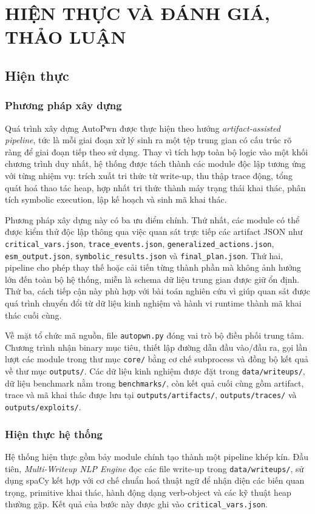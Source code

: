 \documentclass[final]{hcmuitthesis}
\begin{document}
\chapter{HIỆN THỰC VÀ ĐÁNH GIÁ, THẢO LUẬN}

\section{Hiện thực}

\subsection{Phương pháp xây dựng}
Quá trình xây dựng AutoPwn được thực hiện theo hướng \textit{artifact-assisted pipeline}, tức là mỗi giai đoạn xử lý sinh ra một tệp trung gian có cấu trúc rõ ràng để giai đoạn tiếp theo sử dụng. Thay vì tích hợp toàn bộ logic vào một khối chương trình duy nhất, hệ thống được tách thành các module độc lập tương ứng với từng nhiệm vụ: trích xuất tri thức từ write-up, thu thập trace động, tổng quát hoá thao tác heap, hợp nhất tri thức thành máy trạng thái khai thác, phân tích symbolic execution, lập kế hoạch và sinh mã khai thác.

Phương pháp xây dựng này có ba ưu điểm chính. Thứ nhất, các module có thể được kiểm thử độc lập thông qua việc quan sát trực tiếp các artifact JSON như \texttt{critical\_vars.json}, \texttt{trace\_events.json}, \texttt{generalized\_actions.json}, \texttt{esm\_output.json}, \texttt{symbolic\_results.json} và \texttt{final\_plan.json}. Thứ hai, pipeline cho phép thay thế hoặc cải tiến từng thành phần mà không ảnh hưởng lớn đến toàn bộ hệ thống, miễn là schema dữ liệu trung gian được giữ ổn định. Thứ ba, cách tiếp cận này phù hợp với bài toán nghiên cứu vì giúp quan sát được quá trình chuyển đổi từ dữ liệu kinh nghiệm và hành vi runtime thành mã khai thác cuối cùng.

Về mặt tổ chức mã nguồn, file \texttt{autopwn.py} đóng vai trò bộ điều phối trung tâm. Chương trình nhận binary mục tiêu, thiết lập đường dẫn đầu vào/đầu ra, gọi lần lượt các module trong thư mục \texttt{core/} bằng cơ chế subprocess và đồng bộ kết quả về thư mục \texttt{outputs/}. Các dữ liệu kinh nghiệm được đặt trong \texttt{data/writeups/}, dữ liệu benchmark nằm trong \texttt{benchmarks/}, còn kết quả cuối cùng gồm artifact, trace và mã khai thác được lưu tại \texttt{outputs/artifacts/}, \texttt{outputs/traces/} và \texttt{outputs/exploits/}.

\subsection{Hiện thực hệ thống}
Hệ thống hiện thực gồm bảy module chính tạo thành một pipeline khép kín. Đầu tiên, \textit{Multi-Writeup NLP Engine} đọc các file write-up trong \texttt{data/writeups/}, sử dụng spaCy kết hợp với cơ chế chuẩn hoá thuật ngữ để nhận diện các biến quan trọng, primitive khai thác, hành động dạng verb-object và các kỹ thuật heap thường gặp. Kết quả của bước này được ghi vào \texttt{critical\_vars.json}.
\end{document}
